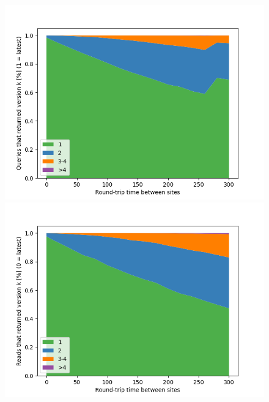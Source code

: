 \begin{figure}
    \centering
    \begin{minipage}{.48\textwidth}
        \centering
        \includegraphics[width=\textwidth]{./figures/evaluation/readV_freshness_netLatency_200.png}
        \caption{}
        \label{}
    \end{minipage}%
    \begin{minipage}{.5\textwidth}
        \centering
        \includegraphics[width=\textwidth]{./figures/evaluation/readV_freshness_netLatency_400.png}
        \caption{}
        \label{}
    \end{minipage}
    \caption{}
\end{figure}




